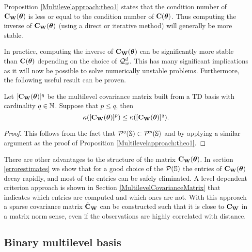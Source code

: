 \documentclass[11pt,final]{amsart}       %
\begin{document}
Proposition \ref{Multilevelapproach:theo1} states that the condition
number of $\mathbf{C}_{\mathbf{W}}(\boldsymbol{\theta})$ is less or equal to the condition
number of $\mathbf{C}(\boldsymbol{\theta})$. Thus computing the inverse of
$\mathbf{C}_{\mathbf{W}}(\boldsymbol{\theta})$ (using a direct or iterative method) will
generally be more stable.

In practice, computing the inverse of $\mathbf{C}_{\mathbf{W}}(\boldsymbol{\theta})$ can be
significantly more stable than $\mathbf{C}(\boldsymbol{\theta})$ depending on the choice
of ${\mathcal Q}^d_w$. This has many significant implications as it will now
be possible to solve numerically unstable problems. Furthermore, the
following useful result can be proven.

\begin{corollary}
  \label{Multilevelapproach:cor1}
  Let $[\mathbf{C}_{\mathbf{W}}(\boldsymbol{\theta})]^q$ be the multilevel
  covariance matrix built from a TD basis with cardinality $q \in
  \mathbb{N}$.  Suppose that $p \leq q$, then
  \[
  \kappa([\mathbf{C}_{\mathbf{W}}(\boldsymbol{\theta})]^p)
  \leq \kappa([\mathbf{C}_{\mathbf{W}}(\boldsymbol{\theta})]^q).
  \]
\end{corollary}
\begin{proof}
  This follows from the fact that ${\mathcal P}^{q}(\mathbb{S}) \subset
  {\mathcal P}^{p}(\mathbb{S})$ and by applying a similar argument as the proof of
  Proposition \ref{Multilevelapproach:theo1}.
\end{proof}


There are other advantages to the structure of the matrix
$\mathbf{C}_{\mathbf{W}}(\boldsymbol{\theta})$.  In section \ref{errorestimates} we show that
for a good choice of the ${\mathcal P}(\mathbb{S})$ the entries of
$\mathbf{C}_{\mathbf{W}}(\boldsymbol{\theta})$ decay rapidly, and most of the entries can be
safely eliminated. A level dependent criterion approach is shown in
Section \ref{MultilevelCovarianceMatrix} that indicates which entries
are computed and which ones are not. With this approach a sparse
covariance matrix $\tilde{\mathbf{C}}_{\mathbf{W}}$ can be constructed such that it
is close to $\mathbf{C}_{\mathbf{W}}$ in a matrix norm sense, even if the
observations are highly correlated with distance.





\subsection{Binary multilevel basis}
\label{MultilevelREML}
\end{document}
